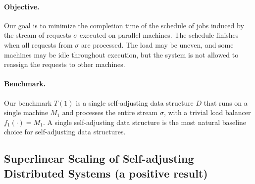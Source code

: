 \paragraph*{Objective.}
Our goal is to minimize the completion time of the schedule of jobs induced by the stream of requests $\sigma$ executed on parallel machines.
The schedule finishes when all requests from $\sigma$ are processed.
The load may be uneven, and some machines may be idle throughout execution, but the system is not allowed to reassign the requests to other machines.




\paragraph*{Benchmark.}
Our benchmark $T(1)$ is a single self-adjusting data structure $D$ that runs on a single machine $M_1$
and processes the entire stream $\sigma$, with a trivial load balancer $f_1(\cdot) = M_1$.
A single self-adjusting data structure is the most natural baseline choice for self-adjusting data structures. 



\subsection{Superlinear Scaling of Self-adjusting\\ Distributed Systems (a positive result)}
\label{sec:app:arch-scaling}







